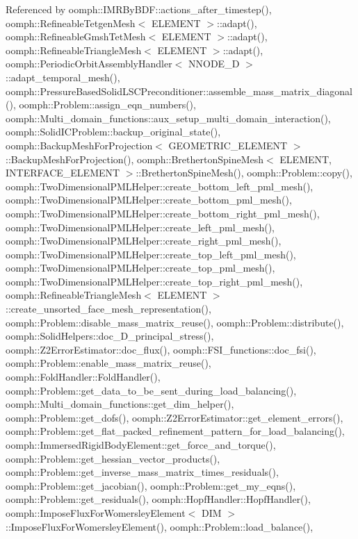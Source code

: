 Referenced by oomph\+::\+I\+M\+R\+By\+B\+D\+F\+::actions\+\_\+after\+\_\+timestep(), oomph\+::\+Refineable\+Tetgen\+Mesh$<$ E\+L\+E\+M\+E\+N\+T $>$\+::adapt(), oomph\+::\+Refineable\+Gmsh\+Tet\+Mesh$<$ E\+L\+E\+M\+E\+N\+T $>$\+::adapt(), oomph\+::\+Refineable\+Triangle\+Mesh$<$ E\+L\+E\+M\+E\+N\+T $>$\+::adapt(), oomph\+::\+Periodic\+Orbit\+Assembly\+Handler$<$ N\+N\+O\+D\+E\+\_\+D $>$\+::adapt\+\_\+temporal\+\_\+mesh(), oomph\+::\+Pressure\+Based\+Solid\+L\+S\+C\+Preconditioner\+::assemble\+\_\+mass\+\_\+matrix\+\_\+diagonal(), oomph\+::\+Problem\+::assign\+\_\+eqn\+\_\+numbers(), oomph\+::\+Multi\+\_\+domain\+\_\+functions\+::aux\+\_\+setup\+\_\+multi\+\_\+domain\+\_\+interaction(), oomph\+::\+Solid\+I\+C\+Problem\+::backup\+\_\+original\+\_\+state(), oomph\+::\+Backup\+Mesh\+For\+Projection$<$ G\+E\+O\+M\+E\+T\+R\+I\+C\+\_\+\+E\+L\+E\+M\+E\+N\+T $>$\+::\+Backup\+Mesh\+For\+Projection(), oomph\+::\+Bretherton\+Spine\+Mesh$<$ E\+L\+E\+M\+E\+N\+T, I\+N\+T\+E\+R\+F\+A\+C\+E\+\_\+\+E\+L\+E\+M\+E\+N\+T $>$\+::\+Bretherton\+Spine\+Mesh(), oomph\+::\+Problem\+::copy(), oomph\+::\+Two\+Dimensional\+P\+M\+L\+Helper\+::create\+\_\+bottom\+\_\+left\+\_\+pml\+\_\+mesh(), oomph\+::\+Two\+Dimensional\+P\+M\+L\+Helper\+::create\+\_\+bottom\+\_\+pml\+\_\+mesh(), oomph\+::\+Two\+Dimensional\+P\+M\+L\+Helper\+::create\+\_\+bottom\+\_\+right\+\_\+pml\+\_\+mesh(), oomph\+::\+Two\+Dimensional\+P\+M\+L\+Helper\+::create\+\_\+left\+\_\+pml\+\_\+mesh(), oomph\+::\+Two\+Dimensional\+P\+M\+L\+Helper\+::create\+\_\+right\+\_\+pml\+\_\+mesh(), oomph\+::\+Two\+Dimensional\+P\+M\+L\+Helper\+::create\+\_\+top\+\_\+left\+\_\+pml\+\_\+mesh(), oomph\+::\+Two\+Dimensional\+P\+M\+L\+Helper\+::create\+\_\+top\+\_\+pml\+\_\+mesh(), oomph\+::\+Two\+Dimensional\+P\+M\+L\+Helper\+::create\+\_\+top\+\_\+right\+\_\+pml\+\_\+mesh(), oomph\+::\+Refineable\+Triangle\+Mesh$<$ E\+L\+E\+M\+E\+N\+T $>$\+::create\+\_\+unsorted\+\_\+face\+\_\+mesh\+\_\+representation(), oomph\+::\+Problem\+::disable\+\_\+mass\+\_\+matrix\+\_\+reuse(), oomph\+::\+Problem\+::distribute(), oomph\+::\+Solid\+Helpers\+::doc\+\_\+D\+\_\+principal\+\_\+stress(), oomph\+::\+Z2\+Error\+Estimator\+::doc\+\_\+flux(), oomph\+::\+F\+S\+I\+\_\+functions\+::doc\+\_\+fsi(), oomph\+::\+Problem\+::enable\+\_\+mass\+\_\+matrix\+\_\+reuse(), oomph\+::\+Fold\+Handler\+::\+Fold\+Handler(), oomph\+::\+Problem\+::get\+\_\+data\+\_\+to\+\_\+be\+\_\+sent\+\_\+during\+\_\+load\+\_\+balancing(), oomph\+::\+Multi\+\_\+domain\+\_\+functions\+::get\+\_\+dim\+\_\+helper(), oomph\+::\+Problem\+::get\+\_\+dofs(), oomph\+::\+Z2\+Error\+Estimator\+::get\+\_\+element\+\_\+errors(), oomph\+::\+Problem\+::get\+\_\+flat\+\_\+packed\+\_\+refinement\+\_\+pattern\+\_\+for\+\_\+load\+\_\+balancing(), oomph\+::\+Immersed\+Rigid\+Body\+Element\+::get\+\_\+force\+\_\+and\+\_\+torque(), oomph\+::\+Problem\+::get\+\_\+hessian\+\_\+vector\+\_\+products(), oomph\+::\+Problem\+::get\+\_\+inverse\+\_\+mass\+\_\+matrix\+\_\+times\+\_\+residuals(), oomph\+::\+Problem\+::get\+\_\+jacobian(), oomph\+::\+Problem\+::get\+\_\+my\+\_\+eqns(), oomph\+::\+Problem\+::get\+\_\+residuals(), oomph\+::\+Hopf\+Handler\+::\+Hopf\+Handler(), oomph\+::\+Impose\+Flux\+For\+Womersley\+Element$<$ D\+I\+M $>$\+::\+Impose\+Flux\+For\+Womersley\+Element(), oomph\+::\+Problem\+::load\+\_\+balance(), 